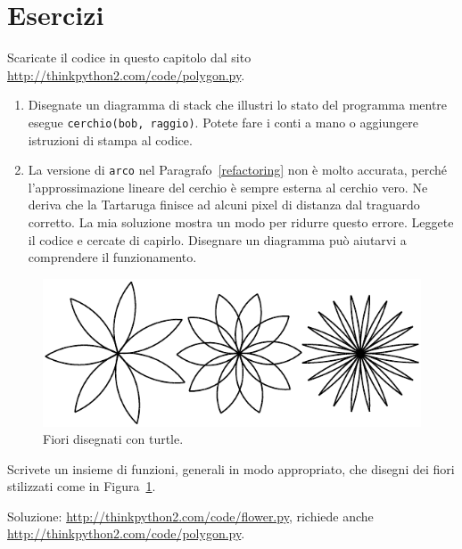 \documentclass[10pt]{book}
\begin{document}
\section{Esercizi}

\begin{exercise}

Scaricate il codice in questo capitolo dal sito
\url{http://thinkpython2.com/code/polygon.py}.

\begin{enumerate}

\item Disegnate un diagramma di stack che illustri lo stato del programma mentre esegue {\tt cerchio(bob, raggio)}. Potete fare i conti a mano o aggiungere istruzioni di stampa al codice.

\item La versione di {\tt arco} nel Paragrafo~\ref{refactoring} non è molto accurata, perché l'approssimazione lineare del cerchio è sempre esterna al cerchio vero. Ne deriva che la Tartaruga finisce ad alcuni pixel di distanza dal traguardo corretto. La mia soluzione mostra un modo per ridurre questo errore. Leggete il codice e cercate di capirlo. Disegnare un diagramma può aiutarvi a comprendere il funzionamento.

\end{enumerate}

\end{exercise}

\begin{figure}
\centerline
{\includegraphics[scale=0.8]{figs/flowers.pdf}}
\caption{Fiori disegnati con turtle.}
\label{fig.flowers}
\end{figure}

\vspace{0.2in}
\begin{exercise}

Scrivete un insieme di funzioni, generali in modo appropriato, che disegni dei fiori stilizzati come in Figura~\ref{fig.flowers}.

Soluzione: \url{http://thinkpython2.com/code/flower.py},
richiede anche \url{http://thinkpython2.com/code/polygon.py}.

\end{exercise}
\end{document}
